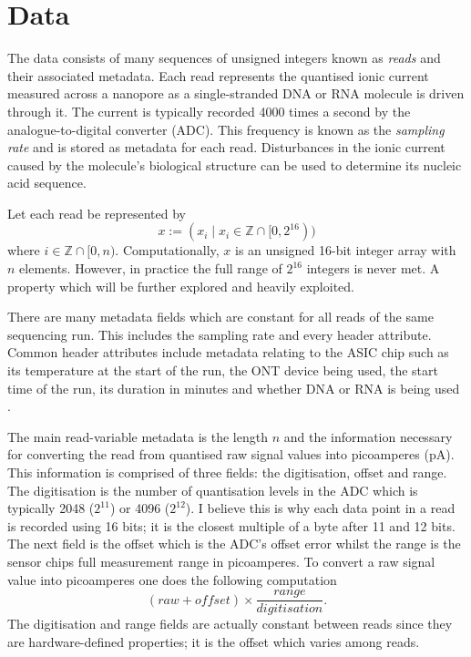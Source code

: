 \chapter{Data} \label{chap:data}





The data consists of many sequences of unsigned integers known as \textit{reads} and their associated metadata. Each read represents the quantised ionic current measured across a nanopore as a single-stranded DNA or RNA molecule is driven through it. The current is typically recorded 4000 times a second by the analogue-to-digital converter (ADC). This frequency is known as the \textit{sampling rate} and is stored as metadata for each read. Disturbances in the ionic current caused by the molecule's biological structure can be used to determine its nucleic acid sequence.

Let each read be represented by
\[ x := (x_i\mid x_i \in \mathbb{Z} \cap [0, 2^{16})) \]
where $i\in \mathbb{Z}\cap [0, n)$. Computationally, $x$ is an unsigned 16-bit integer array with $n$ elements. However, in practice the full range of $2^{16}$ integers is never met. A property which will be further explored and heavily exploited.

There are many metadata fields which are constant for all reads of the same sequencing run. This includes the sampling rate and every header attribute. Common header attributes include metadata relating to the ASIC chip such as its temperature at the start of the run, the ONT device being used, the start time of the run, its duration in minutes and whether DNA or RNA is being used \cite{slow5-spec}.

The main read-variable metadata is the length $n$ and the information necessary for converting the read from quantised raw signal values into picoamperes (pA). This information is comprised of three fields: the digitisation, offset and range. The digitisation is the number of quantisation levels in the ADC which is typically 2048 ($2^{11}$) or 4096 ($2^{12}$). I believe this is why each data point in a read is recorded using 16 bits; it is the closest multiple of a byte after 11 and 12 bits. The next field is the offset which is the ADC's offset error whilst the range is the sensor chips full measurement range in picoamperes. To convert a raw signal value into picoamperes one does the following computation
\[ (raw + offset) \times \frac{range}{digitisation}. \] The digitisation and range fields are actually constant between reads since they are hardware-defined properties; it is the offset which varies among reads.


